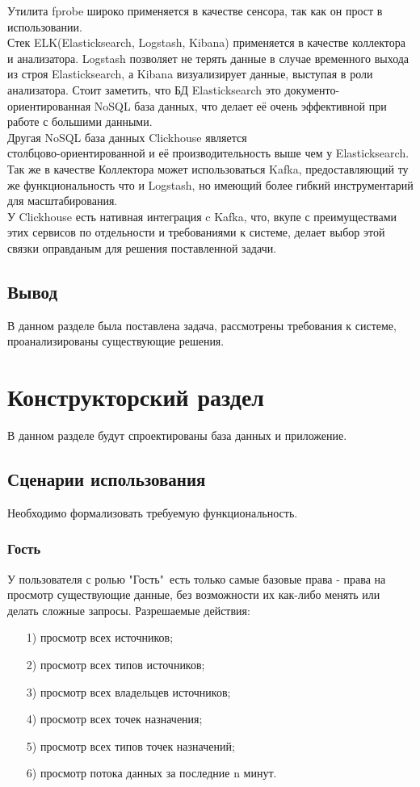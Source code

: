 Утилита fprobe широко применяется в качестве сенсора, так как он прост в использовании. \\
	\indent Стек ELK(Elasticksearch, Logstash, Kibana) применяется в качестве коллектора и анализатора. Logstash позволяет не терять данные в случае временного выхода из строя Elasticksearch, а Kibana визуализирует данные, выступая в роли анализатора. Стоит заметить, что БД Elasticksearch это документо-ориентированная NoSQL база данных, что делает её очень эффективной при работе с большими данными\cite{elastic}. \\
	\indent Другая NoSQL база данных Clickhouse является  \\ столбцово-ориентированной и её производительность выше чем у Elasticksearch\cite{clickhouse-elastic}. \\
	\indent Так же в качестве Коллектора может использоваться Kafka, предоставляющий ту же функциональность что и Logstash, но имеющий более гибкий инструментарий для масштабирования. \\
	\indent У Clickhouse есть нативная интеграция c Kafka, что, вкупе с преимуществами этих сервисов по отдельности и требованиями к системе, делает выбор этой связки оправданым для решения поставленной задачи\cite{clickhouse-kafka}.

\subsection{Вывод}
В данном разделе была поставлена задача, рассмотрены требования к системе, проанализированы существующие решения.


\clearpage
\section{Конструкторский раздел}
В данном разделе будут спроектированы база данных и приложение.


\subsection{Сценарии использования}
Необходимо формализовать требуемую функциональность. 
\subsubsection{Гость}
У пользователя с ролью "Гость"\ есть только самые базовые права - права на просмотр существующие данные, без возможности их как-либо менять или делать сложные запросы.
Разрешаемые действия:
\begin{itemize}
	\item[1)] просмотр всех источников;
	\item[2)] просмотр всех типов источников;
	\item[3)] просмотр всех владельцев источников;
	\item[4)] просмотр всех точек назначения;
	\item[5)] просмотр всех типов точек назначений;
	\item[6)] просмотр потока данных за последние n минут.
\end{itemize}

